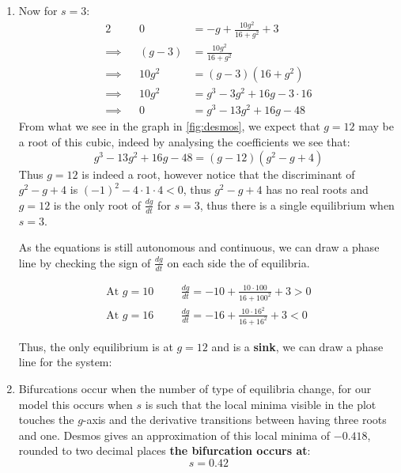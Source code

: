 \documentclass[a4paper, 11pt]{article}
\newcommand*{\TickSize}{0}%
\newcommand*{\AxisMin}{0}%
\newcommand*{\AxisMax}{0}%
\newcommand*{\DrawVerticalPhaseLine}[7][]{%
    \gdef\AxisMin{#5}%
    \gdef\AxisMax{#6}%
    \gdef\TickSize{#7}


    \edef\MyList{#2}%
    \foreach \X in \MyList {
      \draw  (-\TickSize,\X) -- (\TickSize,\X) node [right] {$#1\;=\X$};
    }

    \edef\MyList{#3}%
    \foreach \X in \MyList {%
      \draw [-{Latex[length=2mm, width=2mm]}] (0,\X-0.2) -- (0,\X);
    }

    \edef\MyList{#4}%
    \foreach \X in \MyList {%
      \draw [-{Latex[length=2mm, width=2mm]}] (0,\X+0.2) -- (0,\X);
    }

    \draw  (0,\AxisMin) -- (0,\AxisMax) node [above] {#1};
}%
\begin{document}
\begin{enumerate}[label=(\alph*)]
  \item Now for $s=3$: 
  \begin{alignat*}{2}
            &&    0  &= -g+\frac{10g^2}{16+g^2}+3 \\
  \implies  && (g-3) &= \frac{10g^2}{16+g^2}\\ 
  \implies  && 10g^2 &= (g-3)(16+g^2)\\
  \implies  && 10g^{2}&=g^{3}-3g^{2}+16g-3\cdot16\\
  \implies  && 0&=g^{3}-13g^{2}+16g-48
  \end{alignat*}
  From what we see in the graph in \autoref{fig:desmos}, we expect that $g=12$ may be a root of this cubic, indeed by analysing the coefficients we see that: 
  $$g^{3}-13g^{2}+16g-48 = (g-12)(g^2 -g +4)$$
  Thus $g=12$ is indeed a root, however notice that the discriminant of $g^2 -g +4$ is $(-1)^2-4\cdot 1\cdot 4<0$, thus $g^2 -g +4$ has no real roots and $g=12$ is the only root of $\frac{dg}{dt}$ for $s=3$, thus there is a single equilibrium when $s=3$. 

  As the equations is still autonomous and continuous, we can draw a phase line by checking the sign of $\frac{dg}{dt}$ on each side the of equilibria. 

  \begin{align*}
    \text{At $g=10$}  \quad & \frac{dg}{dt}=  -10+\frac{10\cdot100}{16+100^2}+3>0\\
    \text{At $g=16$ } \quad & \frac{dg}{dt}= -16+\frac{10\cdot16^2}{16+16^2}+3<0
  \end{align*}

  Thus, the only equilibrium is at $g=12$ and is a \textbf{sink}, we can draw a phase line for the system: 

  \begin{center}
  \end{center}






  \item Bifurcations occur when the number of type of equilibria change, for our model this occurs when $s$ is such that the local minima visible in the plot touches the $g$-axis and the derivative transitions between having three roots and one. Desmos gives an approximation of this local minima of $-0.418$, rounded to two decimal places \textbf{the bifurcation occurs at}:
  $$s=0.42$$ 
  

\end{enumerate}
\end{document}
